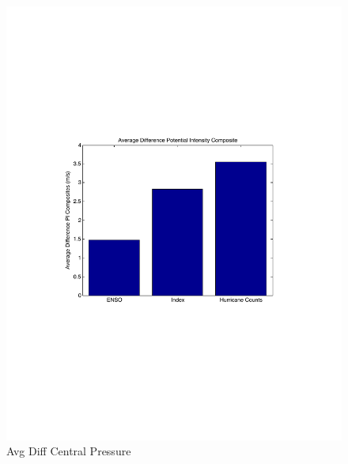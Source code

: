 \documentclass[a4paper,10pt]{article}
\begin{document}
\begin{figure}[ht]
\begin{minipage}[b]{0.6\linewidth}
\includegraphics[width=\textwidth]{figs/sensitivityResults/compositeBarGraphs/avgDiffPIAtlanticCompositesBarGraph.pdf}
\caption{Avg Diff Central Pressure}
\label{fig:figure31}
\end{minipage}
\hspace{0cm}
\begin{minipage}[b]{0.6\linewidth}

\end{minipage}
\end{figure}
\end{document}
